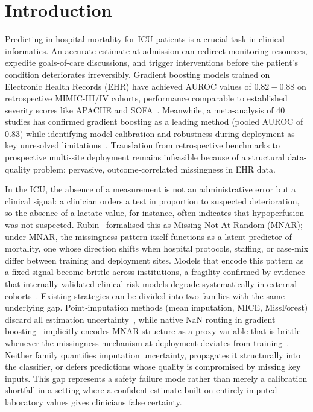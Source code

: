 \documentclass[journal]{IEEEtran}
\begin{document}
	
	
	
	\section{Introduction}
	\label{sec:introduction}
	
	Predicting in-hospital mortality for ICU patients is a crucial task in clinical informatics. An accurate estimate at admission can redirect monitoring resources, expedite goals-of-care discussions, and trigger interventions before the patient's condition deteriorates irreversibly. Gradient boosting models trained on Electronic Health Records (EHR) have achieved AUROC  values of $0.82-0.88$ on retrospective MIMIC-III/IV cohorts, performance comparable to established severity scores like APACHE and SOFA~\cite{purushotham2018benchmarking,johnson2023mimic}. Meanwhile, a meta-analysis of 40 studies has confirmed gradient boosting as a leading method (pooled AUROC of 0.83) while identifying model calibration and robustness during deployment as key unresolved limitations~\cite{sun2025meta}. Translation from retrospective benchmarks to prospective multi-site deployment remains infeasible because of a structural data-quality problem: pervasive, outcome-correlated missingness in EHR data.
	
	In the ICU, the absence of a measurement is not an administrative error but a clinical signal: a clinician orders a test in proportion to suspected deterioration, so the absence of a lactate value, for instance, often indicates that hypoperfusion was not suspected. Rubin~\cite{rubin1976inference} formalised this as Missing-Not-At-Random (MNAR); under MNAR, the missingness pattern itself functions as a latent predictor of mortality, one whose direction shifts when hospital protocols, staffing, or case-mix differ between training and deployment sites. Models that encode this pattern as a fixed signal become brittle across institutions, a fragility confirmed by evidence that internally validated clinical risk models degrade systematically in external cohorts~\cite{moons2012risk,agniel2018biases,josse2019consistency,rockenschaub2024robust}. Existing strategies can be divided into two families with the same underlying gap. Point‑imputation methods (mean imputation, MICE, MissForest) discard all estimation uncertainty~\cite{van2011mice,stekhoven2012missforest}, while native NaN routing in gradient boosting~\cite{chen2016xgboost,ke2017lightgbm} implicitly encodes MNAR structure as a proxy variable that is brittle whenever the missingness mechanism at deployment deviates from training~\cite{sisk2023missing}. Neither family quantifies imputation uncertainty, propagates it structurally into the classifier, or defers predictions whose quality is compromised by missing key inputs. This gap represents a safety failure mode rather than merely a calibration shortfall in a setting where a confident estimate built on entirely imputed laboratory values gives clinicians false certainty.
	
\end{document}
